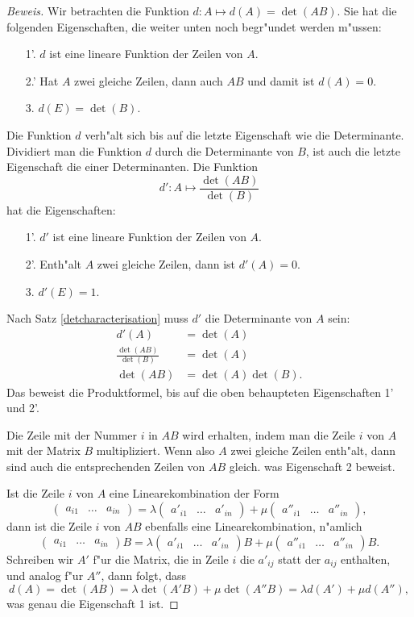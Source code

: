 \begin{proof}[Beweis]
Wir betrachten die Funktion $d\colon A\mapsto d(A) = \det(AB)$.
Sie hat die folgenden Eigenschaften, die weiter unten noch
begr"undet werden m"ussen:
\begin{enumerate}
\item[1'.] $d$ ist eine lineare Funktion der Zeilen von $A$.
\item[2.']
Hat $A$ zwei gleiche Zeilen, dann auch $AB$ und damit ist $d(A)=0$.
\item[3.]
$d(E)=\det(B)$.
\end{enumerate}
Die Funktion $d$ verh"alt sich bis auf die letzte Eigenschaft
wie die Determinante.
Dividiert man die Funktion $d$ durch die Determinante
von $B$, ist auch die letzte Eigenschaft die einer Determinanten.
Die Funktion
\[
d':A\mapsto \frac{\det(AB)}{\det(B)}
\]
hat die Eigenschaften:
\begin{enumerate}
\item[1'.] $d'$ ist eine lineare Funktion der Zeilen von $A$.
\item[2'.] Enth"alt $A$ zwei gleiche Zeilen, dann ist $d'(A)=0$.
\item[3.] $d'(E)=1$.
\end{enumerate}
Nach Satz \ref{detcharacterisation} muss $d'$ die Determinante von $A$ sein:
\begin{align*}
d'(A)&=\det(A)\\
\frac{\det(AB)}{\det(B)}&=\det(A)\\
\det(AB)&=\det(A)\det(B).
\end{align*}
Das beweist die Produktformel, bis auf die oben behaupteten Eigenschaften
1' und 2'.

Die Zeile mit der Nummer $i$ in $AB$ wird erhalten,
indem man die Zeile $i$ von $A$
mit der Matrix $B$ multipliziert.
Wenn also $A$ zwei gleiche Zeilen enth"alt, dann sind auch die
entsprechenden Zeilen von $AB$ gleich.
was Eigenschaft 2 beweist.

Ist die Zeile $i$ von $A$ eine Linearekombination der Form
\[
\begin{pmatrix}
a_{i1}&\dots&a_{in}
\end{pmatrix}
=
\lambda
\begin{pmatrix}
a'_{i1} &\dots &a'_{in}
\end{pmatrix}
+
\mu
\begin{pmatrix}
a''_{i1} &\dots &a''_{in}
\end{pmatrix},
\]
dann ist die Zeile $i$ von $AB$ ebenfalls eine Linearekombination,
n"amlich
\[
\begin{pmatrix}
a_{i1}&\dots&a_{in}
\end{pmatrix}B
=
\lambda
\begin{pmatrix}
a'_{i1} &\dots &a'_{in}
\end{pmatrix}B
+
\mu
\begin{pmatrix}
a''_{i1} &\dots &a''_{in}
\end{pmatrix}B.
\]
Schreiben wir $A'$ f"ur die Matrix, die in Zeile $i$ die $a'_{ij}$
statt der $a_{ij}$ enthalten, und analog f"ur $A''$, dann folgt, dass
\[
d(A) = \det(AB)=\lambda \det(A'B)+\mu\det(A''B)=\lambda d(A') + \mu d(A''),
\]
was genau die Eigenschaft 1 ist.
\end{proof}

